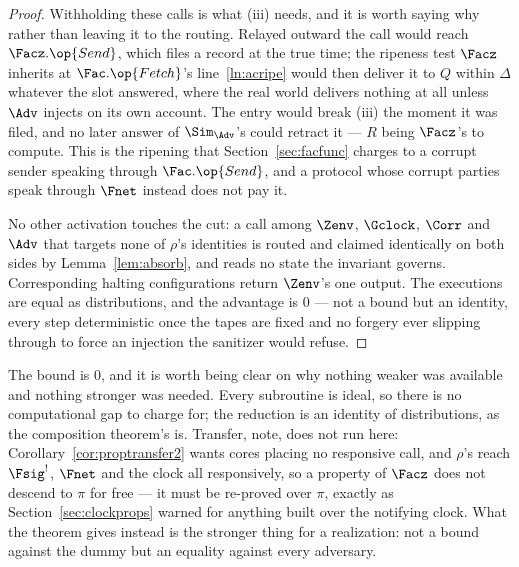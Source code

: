 \documentclass[10pt,oneside,openany]{book}
\theoremstyle{accentdef}
\theoremstyle{accentplain}
\begin{document}
\begin{proof}
Withholding these calls is what (iii) needs, and it is worth saying why rather than leaving it to
the routing. Relayed outward the call would reach $\Facz.\op{Send}$, which files a record at the
true time; the ripeness test $\Facz$ inherits at $\Fac.\op{Fetch}$'s line~\ref{ln:acripe} would
then deliver it to $Q$ within $\Delta$ whatever the slot answered, where the real world delivers
nothing at all unless $\Adv$ injects on its own account.
The entry would break (iii) the moment it was filed, and no later answer of $\Sim_{\Adv}$'s could
retract it --- $R$ being $\Facz$'s to compute. This is the ripening that
Section~\ref{sec:facfunc} charges to a corrupt sender speaking through $\Fac.\op{Send}$, and a
protocol whose corrupt parties speak through $\Fnet$ instead does not pay it.

No other activation touches the cut: a call among $\Zenv$, $\Gclock$, $\Corr$ and $\Adv$ that
targets none of $\rho$'s identities is routed and claimed identically on both sides by
Lemma~\ref{lem:absorb}, and reads no state the invariant governs. Corresponding halting
configurations return $\Zenv$'s one output. The
executions are equal as distributions, and the advantage is $0$ --- not a bound but an identity,
every step deterministic once the tapes are fixed and no forgery ever slipping through to force
an injection the sanitizer would refuse.
\end{proof}

The bound is $0$, and it is worth being clear on why nothing weaker was available and nothing
stronger was needed. Every subroutine is ideal, so there is no computational gap to charge for;
the reduction is an identity of distributions, as the composition theorem's is. Transfer, note,
does not run here: Corollary~\ref{cor:proptransfer2} wants cores placing no responsive call, and
$\rho$'s reach $\Fsig^{!}$, $\Fnet$ and the clock all responsively, so a property of $\Facz$ does
not descend to $\pi$ for free --- it must be re-proved over $\pi$, exactly as
Section~\ref{sec:clockprops} warned for anything built over the notifying clock. What the theorem
gives instead is the stronger thing for a realization: not a bound against the dummy but an
equality against every adversary.
\end{document}
